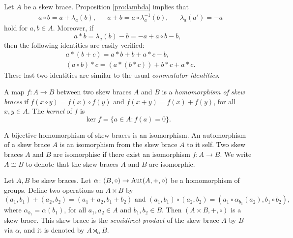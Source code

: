 Let $A$ be a skew brace. 
Proposition \ref{pro:lambda} implies that 
\begin{align}
\label{eq:formulas}
&a\circ b = a+\lambda_a(b),
&&a+b=a\circ \lambda^{-1}_a(b),
&&\lambda_a(a')=-a
\end{align}
hold for $a,b\in A$. Moreover, if 
\[
    a*b=\lambda_a(b)-b=-a+a\circ b-b,
\]
then the following identities are easily verified:
\begin{align}
&a*(b+c)=a*b+b+a*c-b,\\
&(a\circ b)*c=(a*(b*c))+b*c+a*c.
\end{align}
These last two identities are similar to the usual
\emph{commutator identities}.

 \begin{definition}
 	A map $f\colon A\to B$ between two skew braces $A$ and $B$ is a {\em homomorphism of skew braces} if $f(x\circ y)=f(x)\circ f(y)$ and $f(x+y)=f(x)+f(y)$, for all $x,y\in A$.  The \emph{kernel} of $f$ is
     \[
         \ker f=\{a\in A:f(a)=0\}.
     \]
 \end{definition}

A bijective homomorphism of skew braces is an isomorphism. An automorphism of a skew brace $A$ is an isomorphism from the skew brace $A$ to it self. Two skew braces $A$ and $B$ are isomorphisc if there exist an isomorphism $f\colon A\rightarrow B$. We write $A\cong B$ to denote that the skew braces $A$ and $B$ are isomorphic.

\begin{proposition}
\label{prop:semidirect} 
 Let $A,B$ be skew braces. Let $\alpha\colon (B,\circ)\rightarrow \operatorname{Aut}(A,+,\circ)$ be a homomorphism of groups. Define two operations on $A\times B$ by
\[ (a_1,b_1)+(a_2,b_2)=(a_1+a_2,b_1+b_2)\text{ and }(a_1,b_1)\circ (a_2,b_2)=(a_1\circ\alpha_{b_1}(a_2),b_1\circ b_2),\]
where $\alpha_{b_1}=\alpha(b_1)$, for all $a_1,a_2\in A$ and $b_1,b_2\in B$. Then $(A\times B,+,\circ)$ is a skew brace. This skew brace is the {\em semidirect product} of the skew brace $A$ by $B$ via $\alpha$, and it is denoted by $A\rtimes_{\alpha}B$.
\end{proposition}

